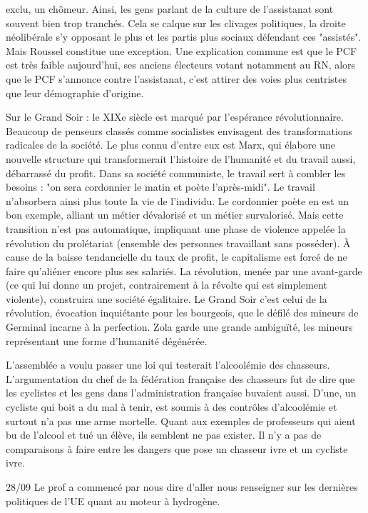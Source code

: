 \documentclass[a4paper,12pt]{book}
\begin{document}
exclu, un chômeur. Ainsi, les gens parlant de la culture de l'assistanat sont souvent bien trop tranchés. Cela se calque sur les clivages politiques, la droite néolibérale s'y opposant le plus et les partis plus sociaux défendant ces "assistés". Mais Roussel constitue une exception. Une explication commune est que le PCF est très faible aujourd'hui, ses anciens électeurs votant notamment au RN, alors que le PCF s'annonce contre l'assistanat, c'est attirer des voies plus centristes que leur démographie d'origine.
\par Sur le Grand Soir : le XIXe siècle est marqué par l'espérance révolutionnaire. Beaucoup de penseurs classés comme socialistes envisagent des transformations radicales de la société. Le plus connu d'entre eux est Marx, qui élabore une nouvelle structure qui transformerait l'histoire de l'humanité et du travail aussi, débarrassé du profit. Dans sa société communiste, le travail sert à combler les besoins : "on sera cordonnier le matin et poète l'après-midi". Le travail n'absorbera ainsi plus toute la vie de l'individu. Le cordonnier poète en est un bon exemple, alliant un métier dévalorisé et un métier survalorisé. Mais cette transition n'est pas automatique, impliquant une phase de violence appelée la révolution du prolétariat (ensemble des personnes travaillant sans posséder). À cause de la baisse tendancielle du taux de profit, le capitalisme est forcé de ne faire qu'aliéner encore plus ses salariés. La révolution, menée par une avant-garde (ce qui lui donne un projet, contrairement à la révolte qui est simplement violente), construira une société égalitaire. Le Grand Soir c'est celui de la révolution, évocation inquiétante pour les bourgeois, que le défilé des mineurs de Germinal incarne à la perfection. Zola garde une grande ambiguïté, les mineurs représentant une forme d'humanité dégénérée.
\par L'assemblée a voulu passer une loi qui testerait l'alcoolémie des chasseurs. L'argumentation du chef de la fédération française des chasseurs fut de dire que les cyclistes et les gens dans l'administration française buvaient aussi. D'une, un cycliste qui boit a du mal à tenir, est soumis à des contrôles d'alcoolémie et surtout n'a pas une arme mortelle. Quant aux exemples de professeurs qui aient bu de l'alcool et tué un élève, ils semblent ne pas exister. Il n'y a pas de comparaisons à faire entre les dangers que pose un chasseur ivre et un cycliste ivre.
\par 28/09 Le prof a commencé par nous dire d'aller nous renseigner sur les dernières politiques de l'UE quant au moteur à hydrogène.
\end{document}
